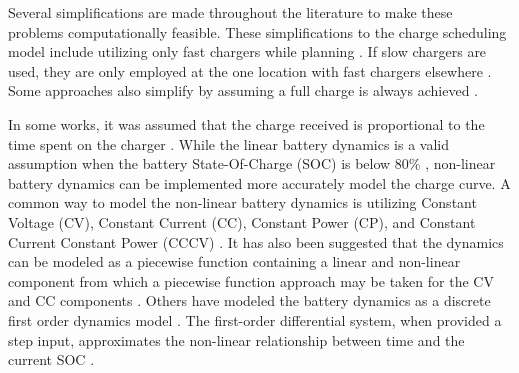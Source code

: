 \documentclass[ee,msthesis]{usuthesis}
\begin{document}
Several simplifications are made throughout the literature to make these problems computationally feasible. These
simplifications to the charge scheduling model include utilizing only fast chargers while planning
\cite{wei-2018-optim-spatio,sebastiani-2016-evaluat-elect,wang-2017-optim-rechar,zhou-2020-bi-objec,yang-2018-charg-sched,wang-2017-elect-vehic,qin-2016-numer-analy,liu-2020-batter-elect}. If slow chargers are used,
they are only employed at the one location with fast chargers elsewhere
\cite{he-2020-optim-charg,tang-2019-robus-sched}. Some approaches also simplify by assuming a full charge is always
achieved \cite{wei-2018-optim-spatio,wang-2017-elect-vehic,zhou-2020-bi-objec,wang-2017-optim-rechar}.

In some works, it was assumed that the charge received is proportional to the time spent on the charger
\cite{liu-2020-batter-elect,yang-2018-charg-sched}. While the linear battery dynamics is a valid assumption when the
battery State-Of-Charge (SOC) is below 80\% \cite{liu-2020-batter-elect}, non-linear battery dynamics can be implemented
more accurately model the charge curve. A common way to model the non-linear battery dynamics is utilizing Constant
Voltage (CV), Constant Current (CC), Constant Power (CP), and Constant Current Constant Power (CCCV)
\cite{abdollahi-2016-optim-batter,chen-2008-desig-grey}. It has also been suggested that the dynamics can be modeled
as a piecewise function containing a linear and non-linear component from which a piecewise function approach may be
taken for the CV and CC components \cite{zhang-2021-optim-elect,abdollahi-2016-optim-batter}. Others have modeled the
battery dynamics as a discrete first order dynamics model \cite{whitaker-2023-a-network}. The first-order differential
system, when provided a step input, approximates the non-linear relationship between time and the current SOC
\cite{whitaker-2023-a-network}.
\end{document}
